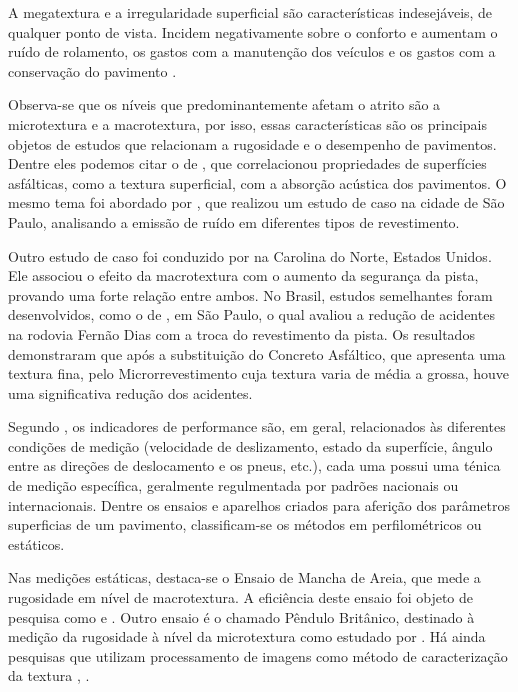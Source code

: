 A megatextura e a irregularidade superficial são características indesejáveis, de qualquer ponto de vista. Incidem negativamente sobre o conforto e aumentam o ruído de rolamento, os gastos com a manutenção dos veículos e os gastos com a conservação do pavimento \cite{azevedo}.

Observa-se que os níveis que predominantemente afetam o atrito são a microtextura e a macrotextura, por isso, essas características são os principais objetos de estudos que relacionam a rugosidade e o desempenho de pavimentos. Dentre eles podemos citar o de , que correlacionou propriedades de superfícies asfálticas, como a textura superficial, com a absorção acústica dos pavimentos. O mesmo tema foi abordado por , que realizou um estudo de caso na cidade de São Paulo, analisando a emissão de ruído em diferentes tipos de revestimento. 

Outro estudo de caso foi conduzido por  na Carolina do Norte, Estados Unidos. Ele associou o efeito da macrotextura com o aumento da segurança da pista, provando uma forte relação entre ambos. No Brasil, estudos semelhantes foram desenvolvidos, como o de , em São Paulo, o qual avaliou a redução de acidentes na rodovia Fernão Dias com a troca do revestimento da pista. Os resultados demonstraram que após a substituição do Concreto Asfáltico, que apresenta uma textura fina, pelo Microrrevestimento cuja textura varia de média a grossa, houve uma significativa redução dos acidentes.  

Segundo , os indicadores de performance são, em geral, relacionados às diferentes condições de medição (velocidade de deslizamento, estado da superfície, ângulo entre as direções de deslocamento e os pneus, etc.), cada uma possui uma ténica de medição específica, geralmente regulmentada por padrões nacionais ou internacionais. Dentre os ensaios e aparelhos criados para aferição dos parâmetros superficias de um pavimento, classificam-se os métodos em perfilométricos ou estáticos. 

Nas medições estáticas, destaca-se o Ensaio de Mancha de Areia, que mede a rugosidade em nível de macrotextura. A eficiência deste ensaio foi objeto de pesquisa como  e  . Outro ensaio é o chamado Pêndulo Britânico, destinado à medição da rugosidade à nível da microtextura como estudado por . Há ainda pesquisas que utilizam processamento de imagens como método de caracterização da textura \cite{slimane}, \cite{khoudeirs}.


